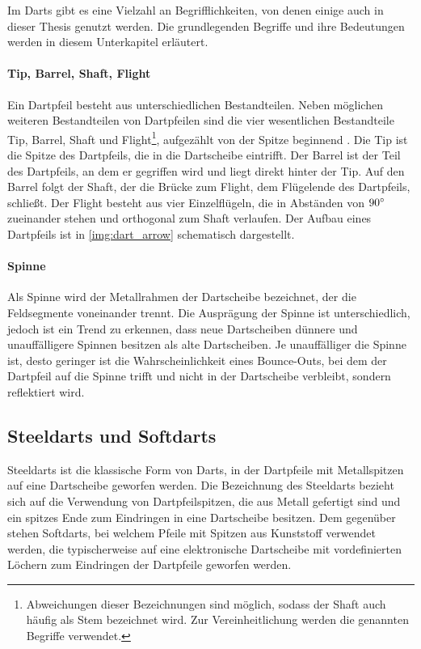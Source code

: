 Im Darts gibt es eine Vielzahl an Begrifflichkeiten, von denen einige auch in dieser Thesis genutzt werden. Die grundlegenden Begriffe und ihre Bedeutungen werden in diesem Unterkapitel erläutert.

\paragraph{Tip, Barrel, Shaft, Flight}

Ein Dartpfeil besteht aus unterschiedlichen Bestandteilen. Neben möglichen weiteren Bestandteilen von Dartpfeilen sind die vier wesentlichen Bestandteile Tip, Barrel, Shaft und Flight\footnote{Abweichungen dieser Bezeichnungen sind möglich, sodass der Shaft auch häufig als Stem bezeichnet wird. Zur Vereinheitlichung werden die genannten Begriffe verwendet.}, aufgezählt von der Spitze beginnend \cite{wdf-rules,pdc_rules}. Die Tip ist die Spitze des Dartpfeils, die in die Dartscheibe eintrifft. Der Barrel ist der Teil des Dartpfeils, an dem er gegriffen wird und liegt direkt hinter der Tip. Auf den Barrel folgt der Shaft, der die Brücke zum Flight, dem Flügelende des Dartpfeils, schließt. Der Flight besteht aus vier Einzelflügeln, die in Abständen von $90^{\circ}$ zueinander stehen und orthogonal zum Shaft verlaufen. Der Aufbau eines Dartpfeils ist in \autoref{img:dart_arrow} schematisch dargestellt.

\paragraph{Spinne}

Als Spinne wird der Metallrahmen der Dartscheibe bezeichnet, der die Feldsegmente voneinander trennt. Die Ausprägung der Spinne ist unterschiedlich, jedoch ist ein Trend zu erkennen, dass neue Dartscheiben dünnere und unauffälligere Spinnen besitzen als alte Dartscheiben. Je unauffälliger die Spinne ist, desto geringer ist die Wahrscheinlichkeit eines Bounce-Outs, bei dem der Dartpfeil auf die Spinne trifft und nicht in der Dartscheibe verbleibt, sondern reflektiert wird.


\subsection{Steeldarts und Softdarts}
\label{sec:steeldarts}

Steeldarts ist die klassische Form von Darts, in der Dartpfeile mit Metallspitzen auf eine Dartscheibe geworfen werden. Die Bezeichnung des Steeldarts bezieht sich auf die Verwendung von Dartpfeilspitzen, die aus Metall gefertigt sind und ein spitzes Ende zum Eindringen in eine Dartscheibe besitzen. Dem gegenüber stehen Softdarts, bei welchem Pfeile mit Spitzen aus Kunststoff verwendet werden, die typischerweise auf eine elektronische Dartscheibe mit vordefinierten Löchern zum Eindringen der Dartpfeile geworfen werden.

